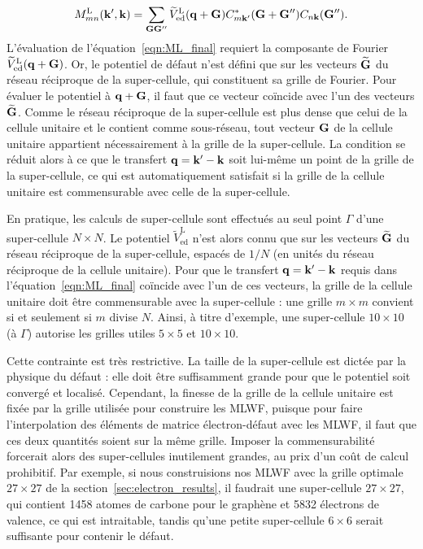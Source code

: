 \begin{equation}
    M_{mn}^\text{L}(\mathbf{k}',\mathbf{k}) = \sum_{\mathbf{G}\mathbf{G}''}\widetilde{V}_\text{ed}^\text{L}(\mathbf{q}+\mathbf{G})C_{m\mathbf{k}'}^*(\mathbf{G}+\mathbf{G}'')C_{n\mathbf{k}}(\mathbf{G}'').\label{eqn:ML_final}
\end{equation}
L'évaluation de l'équation~\eqref{eqn:ML_final} requiert la composante de Fourier $\widetilde{V}_\text{ed}^\text{L}(\mathbf{q}+\mathbf{G})$. Or, le potentiel de défaut n'est défini que sur les vecteurs $\widetilde{\mathbf{G}}$ du réseau réciproque de la super-cellule, qui constituent sa grille de Fourier. Pour évaluer le potentiel à $\mathbf{q}+\mathbf{G}$, il faut que ce vecteur coïncide avec l'un des vecteurs $\widetilde{\mathbf{G}}$. Comme le réseau réciproque de la super-cellule est plus dense que celui de la cellule unitaire et le contient comme sous-réseau, tout vecteur $\mathbf{G}$ de la cellule unitaire appartient nécessairement à la grille de la super-cellule. La condition se réduit alors à ce que le transfert $\mathbf{q}=\mathbf{k}'-\mathbf{k}$ soit lui-même un point de la grille de la super-cellule, ce qui est automatiquement satisfait si la grille de la cellule unitaire est commensurable avec celle de la super-cellule.

En pratique, les calculs de super-cellule sont effectués au seul point $\Gamma$ d'une super-cellule $N\times N$. Le potentiel $\widetilde{V}_\text{ed}^\text{L}$ n'est alors connu que sur les vecteurs $\widetilde{\mathbf{G}}$ du réseau réciproque de la super-cellule, espacés de $1/N$ (en unités du réseau réciproque de la cellule unitaire). Pour que le transfert $\mathbf{q}=\mathbf{k}'-\mathbf{k}$ requis dans l'équation~\eqref{eqn:ML_final} coïncide avec l'un de ces vecteurs, la grille de la cellule unitaire doit être commensurable avec la super-cellule : une grille $m\times m$ convient si et seulement si $m$ divise $N$. Ainsi, à titre d'exemple, une super-cellule $10\times 10$ (à $\Gamma$) autorise les grilles utiles $5\times 5$ et $10\times 10$.

Cette contrainte est très restrictive. La taille de la super-cellule est dictée par la physique du défaut : elle doit être suffisamment grande pour que le potentiel soit convergé et localisé. Cependant, la finesse de la grille de la cellule unitaire est fixée par la grille utilisée pour construire les MLWF, puisque pour faire l'interpolation des éléments de matrice électron-défaut avec les MLWF, il faut que ces deux quantités soient sur la même grille. Imposer la commensurabilité forcerait alors des super-cellules inutilement grandes, au prix d'un coût de calcul prohibitif. Par exemple, si nous construisions nos MLWF avec la grille optimale $27\times 27$ de la section~\ref{sec:electron_results}, il faudrait une super-cellule $27\times 27$, qui contient 1458 atomes de carbone pour le graphène et 5832 électrons de valence, ce qui est intraitable, tandis qu'une petite super-cellule $6\times 6$ serait suffisante pour contenir le défaut.

